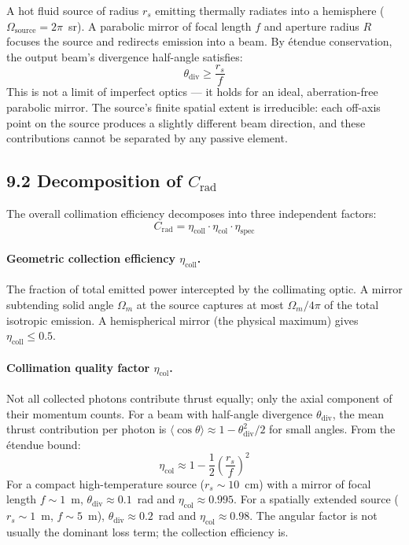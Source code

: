 \documentclass[12pt]{article}
\begin{document}
A hot fluid source of radius $r_s$ emitting thermally radiates into a hemisphere
($\Omega_{\mathrm{source}} = 2\pi$~sr). A parabolic mirror of focal length $f$
and aperture radius $R$ focuses the source and redirects emission into a beam.
By \'{e}tendue conservation, the output beam's divergence half-angle satisfies:
\[
  \theta_{\mathrm{div}} \geq \frac{r_s}{f}
\]
This is not a limit of imperfect optics — it holds for an ideal, aberration-free
parabolic mirror. The source's finite spatial extent is irreducible: each
off-axis point on the source produces a slightly different beam direction, and
these contributions cannot be separated by any passive element.

\subsection*{9.2 Decomposition of $C_{\mathrm{rad}}$}

The overall collimation efficiency decomposes into three independent factors:
\[
  C_{\mathrm{rad}} = \eta_{\mathrm{coll}} \cdot \eta_{\mathrm{col}} \cdot \eta_{\mathrm{spec}}
\]

\paragraph{Geometric collection efficiency $\eta_{\mathrm{coll}}$.}
The fraction of total emitted power intercepted by the collimating optic.
A mirror subtending solid angle $\Omega_m$ at the source captures at most
$\Omega_m / 4\pi$ of the total isotropic emission. A hemispherical mirror
(the physical maximum) gives $\eta_{\mathrm{coll}} \leq 0.5$.

\paragraph{Collimation quality factor $\eta_{\mathrm{col}}$.}
Not all collected photons contribute thrust equally; only the axial component
of their momentum counts. For a beam with half-angle divergence $\theta_{\mathrm{div}}$,
the mean thrust contribution per photon is $\langle \cos\theta \rangle \approx
1 - \theta_{\mathrm{div}}^2/2$ for small angles. From the \'{e}tendue bound:
\[
  \eta_{\mathrm{col}} \approx 1 - \frac{1}{2}\!\left(\frac{r_s}{f}\right)^2
\]
For a compact high-temperature source ($r_s \sim 10$~cm) with a mirror of focal
length $f \sim 1$~m, $\theta_{\mathrm{div}} \approx 0.1$~rad and
$\eta_{\mathrm{col}} \approx 0.995$. For a spatially extended source
($r_s \sim 1$~m, $f \sim 5$~m), $\theta_{\mathrm{div}} \approx 0.2$~rad and
$\eta_{\mathrm{col}} \approx 0.98$. The angular factor is not usually the
dominant loss term; the collection efficiency is.
\end{document}
